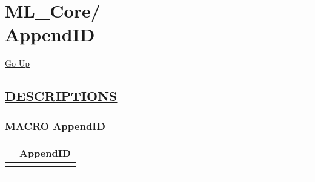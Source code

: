 \chapter*{\color{headfile}
{\large ML\_Core\slash\hspace{0pt}}
 \\
AppendID
}
\hypertarget{ecldoc:toc:ML_Core.AppendID}{}
\hyperlink{ecldoc:toc:root/ML_Core}{Go Up}


\section*{\underline{\textsf{DESCRIPTIONS}}}
\subsection*{\textsf{\colorbox{headtoc}{\color{white} MACRO}
AppendID}}

\hypertarget{ecldoc:ml_core.appendid}{}

{\renewcommand{\arraystretch}{1.5}
\begin{tabularx}{\textwidth}{|>{\raggedright\arraybackslash}l|X|}
\hline
\hspace{0pt}\mytexttt{\color{red} } & \textbf{AppendID} \\
\hline
\multicolumn{2}{|>{\raggedright\arraybackslash}X|}{\hspace{0pt}\mytexttt{\color{param} (dIn,idfield,dOut)}} \\
\hline
\end{tabularx}
}

\par


\rule{\linewidth}{0.5pt}
